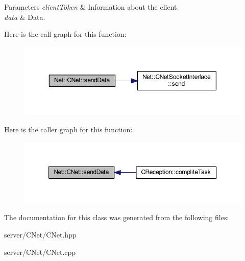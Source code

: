 \begin{DoxyParams}{Parameters}
{\em client\+Token} & Information about the client. \\
\hline
{\em data} & Data. \\
\hline
\end{DoxyParams}
Here is the call graph for this function\+:
\nopagebreak
\begin{figure}[H]
\begin{center}
\leavevmode
\includegraphics[width=350pt]{class_net_1_1_c_net_a22a961e8db355efd94539336937b956b_cgraph}
\end{center}
\end{figure}
Here is the caller graph for this function\+:
\nopagebreak
\begin{figure}[H]
\begin{center}
\leavevmode
\includegraphics[width=350pt]{class_net_1_1_c_net_a22a961e8db355efd94539336937b956b_icgraph}
\end{center}
\end{figure}


The documentation for this class was generated from the following files\+:\begin{DoxyCompactItemize}
\item 
server/\+C\+Net/C\+Net.\+hpp\item 
server/\+C\+Net/C\+Net.\+cpp\end{DoxyCompactItemize}
